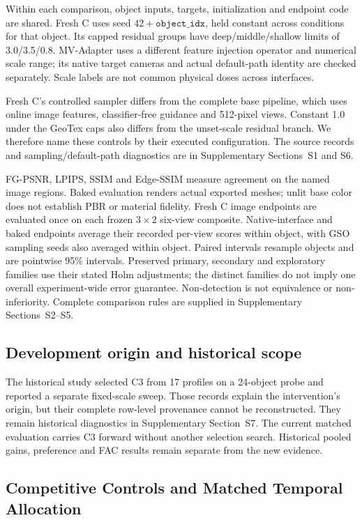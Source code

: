 \documentclass[times,twocolumn,final]{elsarticle}
\begin{document}
Within each comparison, object inputs, targets, initialization and endpoint code are shared. Fresh C uses seed $42+\texttt{object\_idx}$, held constant across conditions for that object. Its capped residual groups have deep/middle/shallow limits of 3.0/3.5/0.8. MV-Adapter uses a different feature injection operator and numerical scale range; its native target cameras and actual default-path identity are checked separately. Scale labels are not common physical doses across interfaces.

Fresh C's controlled sampler differs from the complete base pipeline, which uses online image features, classifier-free guidance and 512-pixel views. Constant 1.0 under the GeoTex caps also differs from the unset-scale residual branch. We therefore name these controls by their executed configuration. The source records and sampling/default-path diagnostics are in Supplementary Sections~S1 and S6.

FG-PSNR, LPIPS, SSIM and Edge-SSIM measure agreement on the named image regions. Baked evaluation renders actual exported meshes; unlit base color does not establish PBR or material fidelity. Fresh C image endpoints are evaluated once on each frozen $3\times2$ six-view composite. Native-interface and baked endpoints average their recorded per-view scores within object, with GSO sampling seeds also averaged within object. Paired intervals resample objects and are pointwise 95\% intervals. Preserved primary, secondary and exploratory families use their stated Holm adjustments; the distinct families do not imply one overall experiment-wide error guarantee. Non-detection is not equivalence or non-inferiority. Complete comparison rules are supplied in Supplementary Sections~S2--S5.

\subsection{Development origin and historical scope}
\label{subsec:c3}
The historical study selected C3 from 17 profiles on a 24-object probe and reported a separate fixed-scale sweep. Those records explain the intervention's origin, but their complete row-level provenance cannot be reconstructed. They remain historical diagnostics in Supplementary Section~S7. The current matched evaluation carries C3 forward without another selection search. Historical pooled gains, preference and FAC results remain separate from the new evidence.

\subsection{Competitive Controls and Matched Temporal Allocation}
\label{subsec:largescale}
\end{document}
